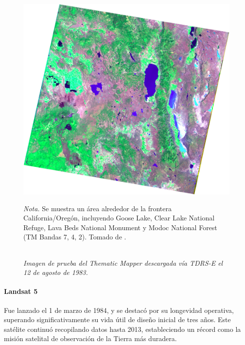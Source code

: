                    \begin{figure}[H] 
                        \caption{\doublespacing \\ \textit{Imagen de prueba del Thematic Mapper descargada vía TDRS-E el 12 de agosto de 1983.}} 
                        \centering
                        \includegraphics[width=1\linewidth]{2_CAPITULO2/IMG/landsat4_tm.png}
                        \begin{justify}
                            \textit{Nota.} Se muestra un área alrededor de la frontera California/Oregón, incluyendo Goose Lake, Clear Lake National Refuge, Lava Beds National Monument y Modoc National Forest (TM Bandas 7, 4, 2​). Tomado de \textcite{landsat_legacy}.
                        \end{justify}                    
                        \label{landsat4_tm}
                    \end{figure}

                \paragraph{Landsat 5}
                    Fue lanzado el 1 de marzo de 1984, y se destacó por su longevidad operativa, superando significativamente su vida útil de diseño inicial de tres años. Este satélite continuó recopilando datos hasta 2013, estableciendo un récord como la misión satelital de observación de la Tierra más duradera.

